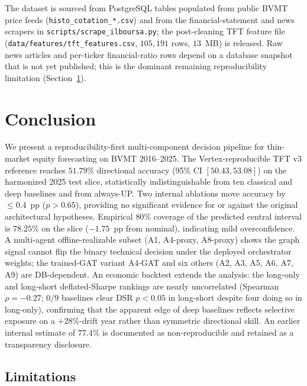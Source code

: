 \documentclass[conference]{IEEEtran}
\begin{document}
The dataset is sourced from PostgreSQL tables populated from public BVMT price feeds (\texttt{histo\_cotation\_*.csv}) and from the financial-statement and news scrapers in \texttt{scripts/scrape\_ilboursa.py}; the post-cleaning TFT feature file (\texttt{data/features/tft\_features.csv}, $105{,}191$ rows, $13$~MB) is released. Raw news articles and per-ticker financial-ratio rows depend on a database snapshot that is not yet published; this is the dominant remaining reproducibility limitation (Section~\ref{sec:conclusion}).

\section{Conclusion}\label{sec:conclusion}

We present a reproducibility-first multi-component decision pipeline for thin-market equity forecasting on BVMT 2016--2025. The Vertex-reproducible TFT v3 reference reaches $51.79\%$ directional accuracy (95\% CI $[50.43, 53.08]$) on the harmonized 2025 test slice, statistically indistinguishable from ten classical and deep baselines and from always-UP. Two internal ablations move accuracy by $\leq 0.4$~pp ($p > 0.65$), providing no significant evidence for or against the original architectural hypotheses. Empirical $80\%$ coverage of the predicted central interval is $78.25\%$ on the slice ($-1.75$~pp from nominal), indicating mild overconfidence. A multi-agent offline-realizable subset (A1, A4-proxy, A8-proxy) shows the graph signal cannot flip the binary technical decision under the deployed orchestrator weights; the trained-GAT variant A4-GAT and six others (A2, A3, A5, A6, A7, A9) are DB-dependent. An economic backtest extends the analysis: the long-only and long-short deflated-Sharpe rankings are nearly uncorrelated (Spearman $\rho=-0.27$; $0/9$ baselines clear DSR $p<0.05$ in long-short despite four doing so in long-only), confirming that the apparent edge of deep baselines reflects selective exposure on a $+28\%$-drift year rather than symmetric directional skill. An earlier internal estimate of $77.4\%$ is documented as non-reproducible and retained as a transparency disclosure.

\subsection{Limitations}
\end{document}
